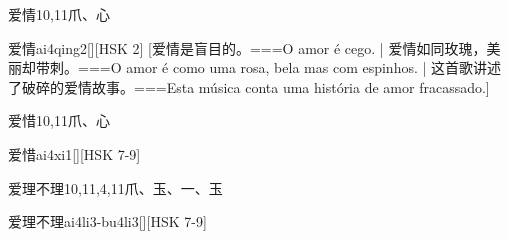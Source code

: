 \begin{Entry}{爱情}{10,11}{⽖、⼼}
  \begin{Phonetics}{爱情}{ai4qing2}[][HSK 2]
    [爱情是盲目的。===O amor é cego. | 爱情如同玫瑰，美丽却带刺。===O amor é como uma rosa, bela mas com espinhos.  | 这首歌讲述了破碎的爱情故事。===Esta música conta uma história de amor fracassado.]
  \end{Phonetics}
\end{Entry}

\begin{Entry}{爱惜}{10,11}{⽖、⼼}
  \begin{Phonetics}{爱惜}{ai4xi1}[][HSK 7-9]
  \end{Phonetics}
\end{Entry}

\begin{Entry}{爱理不理}{10,11,4,11}{⽖、⽟、⼀、⽟}
  \begin{Phonetics}{爱理不理}{ai4li3-bu4li3}[][HSK 7-9]
  \end{Phonetics}
\end{Entry}


